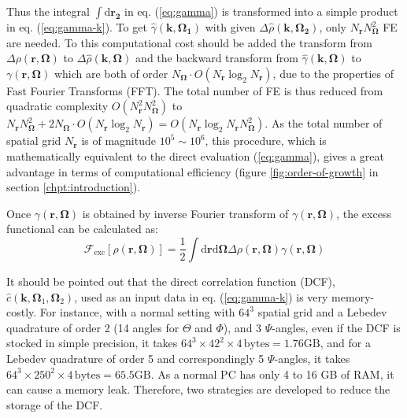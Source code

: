 Thus the integral $\int\mathrm{d}\mathbf{r_{2}}$ in eq. (\ref{eq:gamma})
is transformed into a simple product in eq. (\ref{eq:gamma-k}). To
get $\hat{\gamma}(\mathbf{k},\mathbf{\Omega_{1}})$ with given $\Delta\hat{\rho}(\mathbf{k},\mathbf{\Omega_{2}})$,
only $N_{\mathbf{r}}N_{\mathbf{\Omega}}^{2}$ FE are needed. To this
computational cost should be added the transform from $\Delta\rho(\mathbf{r},\mathbf{\Omega})$
to $\Delta\hat{\rho}(\mathbf{k},\mathbf{\Omega})$ and the backward
transform from $\hat{\gamma}(\mathbf{k},\mathbf{\Omega})$ to $\gamma(\mathbf{r},\mathbf{\Omega})$
which are both of order $N_{\mathbf{\Omega}}\cdot O(N_{\mathbf{r}}\log_{2}N_{\mathbf{r}})$,
due to the properties of Fast Fourier Transforms (FFT). The total
number of FE is thus reduced from quadratic complexity $O(N_{\mathbf{r}}^{2}N_{\mathbf{\Omega}}^{2})$
to $N_{\mathbf{r}}N_{\mathbf{\Omega}}^{2}+2N_{\mathbf{\Omega}}\cdot O(N_{\mathbf{r}}\log_{2}N_{\mathbf{r}})=O(N_{\mathbf{r}}\log_{2}N_{\mathbf{r}}N_{\mathbf{\Omega}}^{2})$.
As the total number of spatial grid $N_{\mathbf{r}}$ is of magnitude
$10^{5}\sim10^{6}$, this procedure, which is mathematically equivalent
to the direct evaluation (\ref{eq:gamma}), gives a great advantage
in terms of computational efficiency (figure \ref{fig:order-of-growth}
in section \ref{chpt:introduction}).

Once $\gamma(\mathbf{r},\mathbf{\Omega})$ is obtained by inverse
Fourier transform of $\gamma(\mathbf{r},\mathbf{\Omega})$, the excess
functional can be calculated as:
\begin{equation}
\mathcal{F}_{\mathrm{exc}}[\rho(\mathbf{r},\mathbf{\Omega})]=\frac{1}{2}\int\mathrm{d}\mathbf{r}\mathrm{d}\mathbf{\Omega}\Delta\rho(\mathbf{r},\mathbf{\Omega})\gamma(\mathbf{r},\mathbf{\Omega})
\end{equation}

It should be pointed out that the direct correlation function (DCF),
$\hat{c}(\mathbf{k},\mathbf{\Omega}_{1},\mathbf{\Omega}_{2})$, used
as an input data in eq. (\ref{eq:gamma-k}) is very memory-costly.
For instance, with a normal setting with $64^{3}$ spatial grid and
a Lebedev quadrature of order 2 (14 angles for $\Theta$ and $\Phi$),
and 3 $\Psi$-angles, even if the DCF is stocked in simple precision,
it takes $64^{3}\times42^{2}\times4\,\mathrm{bytes}=1.76\mathrm{GB}$,
and for a Lebedev quadrature of order 5 and correspondingly 5 $\Psi$-angles,
it takes $64^{3}\times250^{2}\times4\,\mathrm{bytes}=65.5\mathrm{GB}$.
As a normal PC has only 4 to 16 GB of RAM, it can cause a memory leak.
Therefore, two strategies are developed to reduce the storage of the
DCF.

